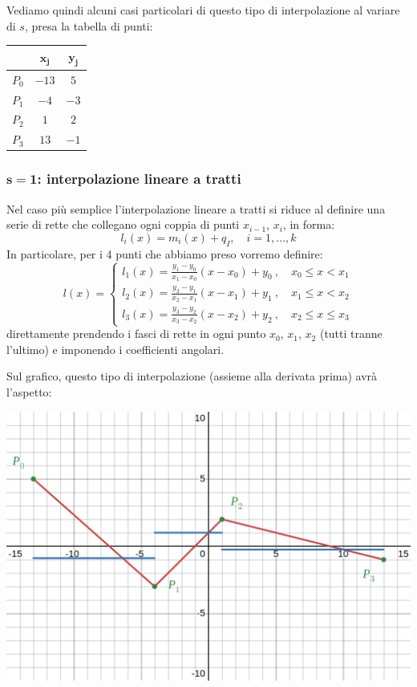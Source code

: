 \documentclass[a4paper,11pt]{article}
\begin{document}
Vediamo quindi alcuni casi particolari di questo tipo di interpolazione al variare di $s$, presa la tabella di punti: 
\begin{table}[h!]
	\center 
	\begin{tabular} { c | c c }
		& $\mathbf{x_j}$ & $\mathbf{y_j}$ \\
		\hline
		$P_0$ & $-13$ & $5$ \\ 
		$P_1$ & $-4$ & $-3$ \\ 
		$P_2$ & $1$ & $2$ \\ 
		$P_3$ & $13$ & $-1$
	\end{tabular}
\end{table}

\subsubsection{$\mathbf{s = 1}$: interpolazione lineare a tratti}
Nel caso più semplice l'interpolazione lineare a tratti si riduce al definire una serie di rette che collegano ogni coppia di punti $x_{i - 1}$, $x_{i}$, in forma:
$$
l_i(x) = m_i(x)+ q_I, \quad i = 1, ..., k 
$$
In particolare, per i 4 punti che abbiamo preso vorremo definire:
\[
	l(x) = 
	\begin{cases}
		l_{1}\left(x\right)=\frac{y_{1}-y_{0}}{x_{1}-x_{0}}\left(x-x_{0}\right)+y_{0}\ , \quad x_{0}\le x < x_{1} \\
		l_{2}\left(x\right)=\frac{y_{2}-y_{1}}{x_{2}-x_{1}}\left(x-x_{1}\right)+y_{1}\ , \quad x_{1}\le x < x_{2} \\
		l_{3}\left(x\right)=\frac{y_{3}-y_{2}}{x_{3}-x_{2}}\left(x-x_{2}\right)+y_{2}\ , \quad x_{2}\le x\le x_{3}
	\end{cases}
\]
direttamente prendendo i fasci di rette in ogni punto $x_0$, $x_1$, $x_2$ (tutti tranne l'ultimo) e imponendo i coefficienti angolari.

\par\medskip
\noindent

\begin{minipage}{\textwidth}

Sul grafico, questo tipo di interpolazione (assieme alla derivata prima) avrà l'aspetto:
\begin{center}
	\includegraphics[scale=0.3]{../figures/multipoly_1.png}
\end{center}
\end{minipage}
\end{document}
